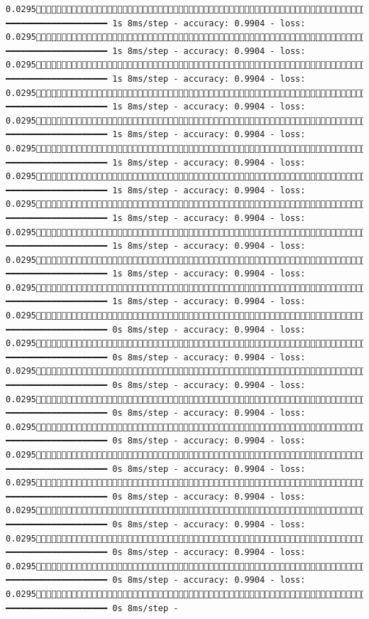 \documentclass[
  letterpaper,
  DIV=11,
  numbers=noendperiod]{scrreprt}
\begin{document}
\begin{verbatim}
0.02951675/1875 ━━━━━━━━━━━━━━━━━━━━ 1s 8ms/step - accuracy: 0.9904 - loss: 0.02951681/1875 ━━━━━━━━━━━━━━━━━━━━ 1s 8ms/step - accuracy: 0.9904 - loss: 0.02951687/1875 ━━━━━━━━━━━━━━━━━━━━ 1s 8ms/step - accuracy: 0.9904 - loss: 0.02951693/1875 ━━━━━━━━━━━━━━━━━━━━ 1s 8ms/step - accuracy: 0.9904 - loss: 0.02951700/1875 ━━━━━━━━━━━━━━━━━━━━ 1s 8ms/step - accuracy: 0.9904 - loss: 0.02951707/1875 ━━━━━━━━━━━━━━━━━━━━ 1s 8ms/step - accuracy: 0.9904 - loss: 0.02951714/1875 ━━━━━━━━━━━━━━━━━━━━ 1s 8ms/step - accuracy: 0.9904 - loss: 0.02951721/1875 ━━━━━━━━━━━━━━━━━━━━ 1s 8ms/step - accuracy: 0.9904 - loss: 0.02951727/1875 ━━━━━━━━━━━━━━━━━━━━ 1s 8ms/step - accuracy: 0.9904 - loss: 0.02951733/1875 ━━━━━━━━━━━━━━━━━━━━ 1s 8ms/step - accuracy: 0.9904 - loss: 0.02951740/1875 ━━━━━━━━━━━━━━━━━━━━ 1s 8ms/step - accuracy: 0.9904 - loss: 0.02951747/1875 ━━━━━━━━━━━━━━━━━━━━ 0s 8ms/step - accuracy: 0.9904 - loss: 0.02951754/1875 ━━━━━━━━━━━━━━━━━━━━ 0s 8ms/step - accuracy: 0.9904 - loss: 0.02951761/1875 ━━━━━━━━━━━━━━━━━━━━ 0s 8ms/step - accuracy: 0.9904 - loss: 0.02951768/1875 ━━━━━━━━━━━━━━━━━━━━ 0s 8ms/step - accuracy: 0.9904 - loss: 0.02951775/1875 ━━━━━━━━━━━━━━━━━━━━ 0s 8ms/step - accuracy: 0.9904 - loss: 0.02951782/1875 ━━━━━━━━━━━━━━━━━━━━ 0s 8ms/step - accuracy: 0.9904 - loss: 0.02951789/1875 ━━━━━━━━━━━━━━━━━━━━ 0s 8ms/step - accuracy: 0.9904 - loss: 0.02951795/1875 ━━━━━━━━━━━━━━━━━━━━ 0s 8ms/step - accuracy: 0.9904 - loss: 0.02951802/1875 ━━━━━━━━━━━━━━━━━━━━ 0s 8ms/step - accuracy: 0.9904 - loss: 0.02951808/1875 ━━━━━━━━━━━━━━━━━━━━ 0s 8ms/step - accuracy: 0.9904 - loss: 0.02951814/1875 ━━━━━━━━━━━━━━━━━━━━ 0s 8ms/step - 
\end{verbatim}
\end{document}
